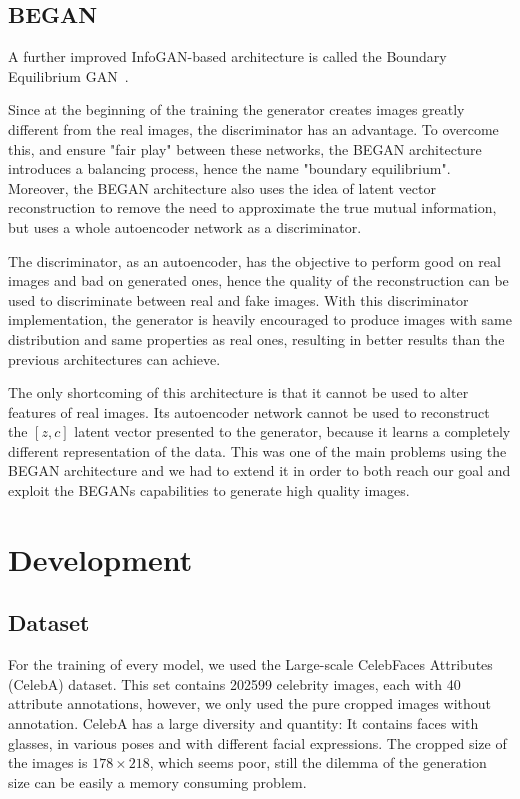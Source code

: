 \documentclass{egpubl}
\begin{document}
\subsection{BEGAN}
\label{sec:digErr}

A further improved InfoGAN-based architecture is called the Boundary Equilibrium GAN~\cite{berthelot2017began}.

Since %
at the beginning of the training the generator creates images greatly different from the real images, %
the discriminator has an advantage. To overcome this, %
and ensure "fair play" between these networks, %
the BEGAN architecture introduces a balancing process, hence the name "boundary equilibrium".
Moreover, %
the BEGAN architecture also uses the idea of latent vector reconstruction to remove the need to approximate the true mutual information, but uses a whole autoencoder network as a discriminator.

The discriminator, as an autoencoder, %
has the objective to perform good on real images and bad on generated ones, hence the quality of the reconstruction can be used to discriminate between real and fake images. With %
this discriminator implementation, the generator is heavily encouraged to produce images with same distribution and same properties as real ones, resulting in better results than the %
previous architectures can achieve.

The only shortcoming of this architecture is that it cannot be used to alter features of real images. Its autoencoder network cannot be used to reconstruct the $[z,c]$ latent vector presented to the generator, %
because it learns a completely %
different representation of the data. This was one of the %
main problems %
using the BEGAN architecture and we had to extend it in order to both reach our goal and exploit the BEGANs capabilities to generate high quality images.


\section{Development} %


\subsection{Dataset}

For the training of every model, %
we used the Large-scale CelebFaces Attributes (CelebA) dataset. This set contains 202599 celebrity images, each with 40 attribute annotations, %
however, %
we only used the pure cropped images without annotation. CelebA has a large diversity and quantity: %
It contains %
faces with glasses, in various poses and with different facial expressions. %
The cropped size of the images is $178\times 218$, %
which seems poor, still %
the dilemma of the generation size can be easily a memory consuming problem. %
\end{document}
